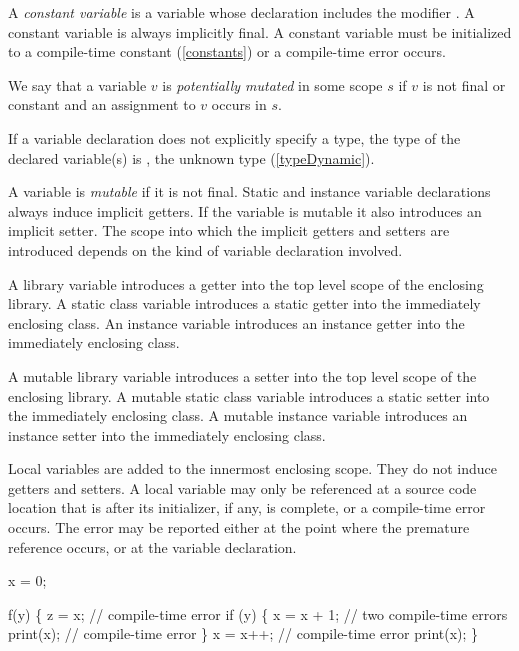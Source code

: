 \documentclass{article}
\begin{document}
\LMHash{}
A {\em constant variable} is a variable whose declaration includes the modifier \CONST{}.
A constant variable is always implicitly final.
A constant variable must be initialized to a compile-time constant (\ref{constants}) or a compile-time error occurs.

\LMHash{}
We say that a variable $v$ is {\em potentially mutated} in some scope $s$ if $v$ is not final or constant and an assignment to $v$ occurs in $s$.

\LMHash{}
If a variable declaration does not explicitly specify a type, the type of the declared variable(s) is \DYNAMIC{}, the unknown type (\ref{typeDynamic}).

\LMHash{}
A variable is {\em mutable} if it is not final.
Static and instance variable declarations always induce implicit getters.
If the variable is mutable it also introduces an implicit setter.
The scope into which the implicit getters and setters are introduced depends on the kind of variable declaration involved.

\LMHash{}
A library variable introduces a getter into the top level scope of the enclosing library.
A static class variable introduces a static getter into the immediately enclosing class.
An instance variable introduces an instance getter into the immediately enclosing class.

\LMHash{}
A mutable library variable introduces a setter into the top level scope of the enclosing library.
A mutable static class variable introduces a static setter into the immediately enclosing class.
A mutable instance variable introduces an instance setter into the immediately enclosing class.

\LMHash{}
Local variables are added to the innermost enclosing scope.
They do not induce getters and setters.
A local variable may only be referenced at a source code location that is after its initializer, if any, is complete, or a compile-time error occurs.
The error may be reported either at the point where the premature reference occurs, or at the variable declaration.



\begin{dartCode}
\VAR{} x = 0;

f(y) \{
  \VAR{} z = x; // compile-time error
  if (y) \{
    x = x + 1; // two compile-time errors
    print(x); // compile-time error
  \}
  \VAR{} x = x++; // compile-time error
  print(x);
\}
\end{dartCode}
\end{document}
